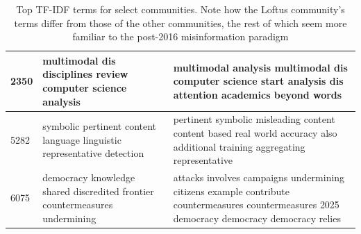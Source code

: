 \documentclass[          
 pre,
 twocolumn,
 twoside,
 superscriptaddress,
 amsmath,
 amssymb,                
 apsf
]{revtex4-2}
\begin{document}
\begin{table}[t]
\begin{tabular}{p{} p{} p{}}
\\
\hline
2350 & multimodal \newline dis \newline disciplines \newline review \newline computer \newline science \newline analysis & multimodal analysis \newline multimodal dis \newline computer science \newline 2020 start \newline analysis dis \newline attention academics \newline beyond words 
\\
\hline
5282 & symbolic \newline pertinent \newline content \newline language \newline linguistic \newline representative \newline detection & pertinent symbolic \newline misleading content \newline content based \newline real world \newline accuracy also \newline additional training \newline aggregating representative 
\\
\hline
6075 & democracy \newline knowledge \newline shared \newline discredited \newline frontier \newline countermeasures \newline undermining & attacks involves \newline campaigns undermining \newline citizens example \newline contribute countermeasures \newline countermeasures 2025 \newline democracy democracy \newline democracy relies \\
\hline
\end{tabular}

\caption{Top TF-IDF terms for select communities. Note how the Loftus community's terms differ from those of the other communities, the rest of which seem more familiar to the post-2016 misinformation paradigm} 
\label{tab:tfidf}
\end{table}
\end{document}
